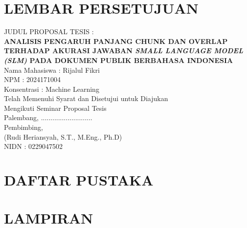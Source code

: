 \documentclass[12pt, a4paper, oneside]{report}
\renewcommand{\bibsection}{%
  \chapter*{DAFTAR PUSTAKA}%
  \addcontentsline{toc}{chapter}{DAFTAR PUSTAKA}%
}
\begin{document}
\chapter*{LEMBAR PERSETUJUAN}
\begin{center}
    JUDUL PROPOSAL TESIS :\\
    \textbf{\MakeUppercase{Analisis Pengaruh Panjang Chunk dan Overlap terhadap Akurasi Jawaban \textit{Small Language Model (SLM)} pada Dokumen Publik Berbahasa Indonesia}}\\
    \vspace{1cm}
    Nama Mahasiswa : Rijalul Fikri\\
    NPM : 2024171004\\
    Konsentrasi : Machine Learning\\
    \vspace{1cm}
    Telah Memenuhi Syarat dan Disetujui untuk Diajukan\\
    Mengikuti Seminar Proposal Tesis\\
    \vspace{1.5cm}
    Palembang, ...........................\\
    Pembimbing,\\
    \vspace{2.5cm}
    (Rudi Heriansyah, S.T., M.Eng., Ph.D)\\
    NIDN : 0229047502

\end{center}
\newpage

\tableofcontents
\newpage

\listoftables
{}
\newpage

\listoffigures
{}
\newpage

\pagestyle{body}







\setlength{\parindent}{0cm} %
% 
\bibsection

\chapter*{LAMPIRAN}
\end{document}
